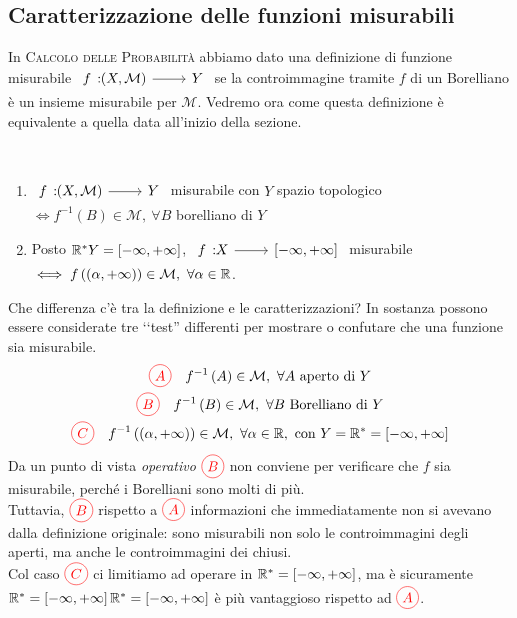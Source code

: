 \subsection{Caratterizzazione delle funzioni misurabili}
In \textsc{Calcolo delle Probabilità} abbiamo dato una definizione di funzione misurabile $\funz{f}{\left(X,\mathcal{M}\right)}{Y}$ se la controimmagine tramite $f$ di un Borelliano è un insieme misurabile per $\mathcal{M}$. Vedremo ora come questa definizione è equivalente a quella data all'inizio della sezione.
\begin{theorema}~{}\label{caratterizzazionefunzionimisurabili}
	\begin{enumerate}
		\item $\funz{f}{\left(X,\mathcal{M}\right)}{Y}$ misurabile con $Y$ spazio topologico $\iff f^{-1}\left(B\right)\in\mathcal{M},\ \forall B$ borelliano di $Y$
		\item Posto $\mathbb{R}^{\ast}Y=\left[-\infty,+\infty\right]$, $\funz{f}{X}{\left[-\infty,+\infty\right]}$ misurabile $\iff f\left(\left(\alpha,+\infty\right)\right)\in\mathcal{M},\ \forall \alpha\in\mathbb{R}$.
	\end{enumerate}
\end{theorema}
Che differenza c'è tra la definizione e le caratterizzazioni? In sostanza possono essere considerate tre ‘‘test'' differenti per mostrare o confutare che una funzione sia misurabile.
\begin{gather*}
	\textcolor{red}{\circled{A}}\quad f^{-1}\left(A\right)\in\mathcal{M},\ \forall A\text{ aperto di }Y\\
	\textcolor{red}{\circled{B}}\quad f^{-1}\left(B\right)\in\mathcal{M},\ \forall B\text{ Borelliano di }Y\\
	\textcolor{red}{\circled{C}}\quad f^{-1}\left(\left(\alpha,+\infty\right)\right)\in\mathcal{M},\ \forall \alpha\in\realset,\ \text{con }Y=\realset^{\ast}=\left[-\infty,+\infty\right]
\end{gather*}
Da un punto di vista \textit{operativo} $\textcolor{red}{\circled{B}}$ non conviene per verificare che $f$ sia misurabile, perché i Borelliani sono molti di più.\\
Tuttavia, $\textcolor{red}{\circled{B}}$ rispetto a  $\textcolor{red}{\circled{A}}$ informazioni che immediatamente non si avevano dalla definizione originale: sono misurabili non solo le controimmagini degli aperti, ma anche le controimmagini dei chiusi.\\
Col caso $\textcolor{red}{\circled{C}}$ ci limitiamo ad operare in $\mathbb{R}^{\ast}=\left[-\infty,+\infty\right]$, ma è sicuramente $\mathbb{R}^{\ast}=\left[-\infty,+\infty\right]\mathbb{R}^{\ast}=\left[-\infty,+\infty\right]$ è più vantaggioso rispetto ad $\textcolor{red}{\circled{A}}$.
